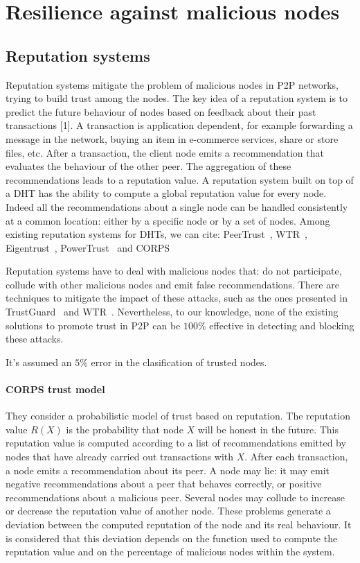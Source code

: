 \section{Resilience against malicious nodes}

 \subsection{Reputation systems}
Reputation systems mitigate the problem of malicious nodes in
P2P networks, trying to build trust among the nodes. The key
idea of a reputation system is to predict the future behaviour
of nodes based on feedback about their past transactions [1]. A
transaction is application dependent, for example forwarding a
message in the network, buying an item in e-commerce services,
share or store files, etc. After a transaction, the client node emits
a recommendation that evaluates the behaviour of the other peer.
The aggregation of these recommendations leads to a reputation
value.
A reputation system built on top of a DHT has the ability
to compute a global reputation value for every node. Indeed
all the recommendations about a single node can be handled
consistently at a common location: either by a specific node
or by a set of nodes. Among existing reputation systems for
DHTs, we can cite: PeerTrust~\cite{peertrust}, WTR~\cite{wtr},
Eigentrust~\cite{eigentrust},
PowerTrust~\cite{powertrust} and CORPS~\cite{corps}

Reputation systems have to deal with malicious nodes that:
do not participate, collude with other malicious nodes and
emit false recommendations. There are techniques to mitigate
the impact of these attacks, such as the ones presented in
TrustGuard~\cite{trustguard} and WTR~\cite{wtr}. Nevertheless, to our knowledge,
none of the existing solutions to promote trust in P2P can be
$100\%$ effective in detecting and blocking these attacks.

It's assumed an $5\%$ error in the clasification of trusted nodes.


\paragraph{CORPS trust model}
\label{sec:corps}
They consider a probabilistic model of trust based on reputation.
The reputation value $R(X)$ is the probability that node $X$ will
be honest in the future. This reputation value is computed
according to a list of recommendations emitted by nodes that
have already carried out transactions with $X$.
After each transaction, a node emits a recommendation
about its peer. A node may lie: it may emit negative
recommendations about a peer that behaves correctly, or
positive recommendations about a malicious peer. Several nodes
may collude to increase or decrease the reputation value of
another node. These problems generate a deviation between
the computed reputation of the node and its real behaviour. It is
considered that this deviation depends on the function used to
compute the reputation value and on the percentage of malicious
nodes within the system.

